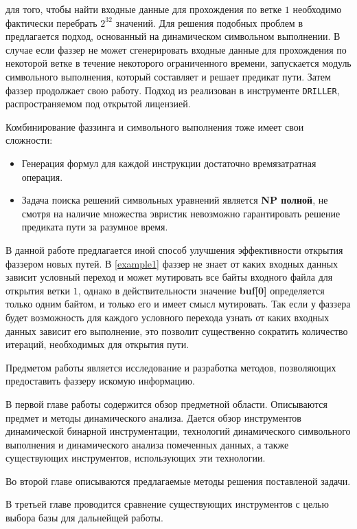 для того, чтобы найти входные данные для прохождения по ветке $1$ необходимо фактически перебрать $2^{32}$ значений. Для решения подобных проблем в \cite{DRILLER} предлагается подход, основанный на динамическом символьном выполнении. В случае если фаззер не может сгенерировать входные данные для прохождения по некоторой ветке в течение некоторого ограниченного времени, запускается модуль символьного выполнения, который составляет и решает предикат пути. Затем фаззер продолжает свою работу.
Подход из \cite{DRILLER} реализован в инструменте \texttt{DRILLER}, распространяемом под открытой лицензией.

Комбинирование фаззинга и символьного выполнения тоже имеет свои сложности:
\begin{itemize}
    \item Генерация формул для каждой инструкции достаточно времязатратная операция.
    \item Задача поиска решений символьных уравнений является \textbf{NP полной}, не смотря на наличие множества эвристик невозможно гарантировать решение предиката пути за разумное время.
\end{itemize}

В данной работе предлагается иной способ улучшения эффективности открытия фаззером новых путей. В \ref{example1} фаззер не знает от каких входных данных зависит условный переход и может мутировать все байты входного файла для открытия ветки $1$, однако в действительности значение \textbf{buf[0]} определяется только одним байтом, и только его и имеет смысл мутировать.
Так если у фаззера будет возможность для каждого условного перехода узнать от каких входных данных зависит его выполнение, это позволит существенно сократить количество итераций, необходимых для открытия пути.

Предметом работы является исследование и разработка методов, позволяющих предоставить фаззеру искомую информацию.

В первой главе работы содержится обзор предметной области. Описываются предмет и методы динамического анализа. Дается обзор инструментов динамической бинарной инструментации, технологий динамического символьного выполнения и динамического анализа помеченных данных, а также существующих инструментов, использующих эти технологии.

Во второй главе описываются предлагаемые методы решения поставленой задачи.

В третьей главе проводится сравнение существующих инструментов с целью выбора базы для дальнейщей работы.

